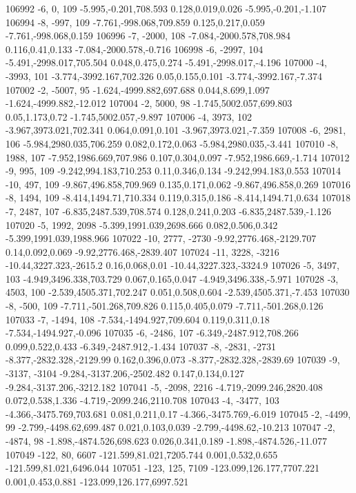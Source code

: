 106992	-6, 0, 109	-5.995,-0.201,708.593	0.128,0.019,0.026	-5.995,-0.201,-1.107
106994	-8, -997, 109	-7.761,-998.068,709.859	0.125,0.217,0.059	-7.761,-998.068,0.159
106996	-7, -2000, 108	-7.084,-2000.578,708.984	0.116,0.41,0.133	-7.084,-2000.578,-0.716
106998	-6, -2997, 104	-5.491,-2998.017,705.504	0.048,0.475,0.274	-5.491,-2998.017,-4.196
107000	-4, -3993, 101	-3.774,-3992.167,702.326	0.05,0.155,0.101	-3.774,-3992.167,-7.374
107002	-2, -5007, 95	-1.624,-4999.882,697.688	0.044,8.699,1.097	-1.624,-4999.882,-12.012
107004	-2, 5000, 98	-1.745,5002.057,699.803	0.05,1.173,0.72	-1.745,5002.057,-9.897
107006	-4, 3973, 102	-3.967,3973.021,702.341	0.064,0.091,0.101	-3.967,3973.021,-7.359
107008	-6, 2981, 106	-5.984,2980.035,706.259	0.082,0.172,0.063	-5.984,2980.035,-3.441
107010	-8, 1988, 107	-7.952,1986.669,707.986	0.107,0.304,0.097	-7.952,1986.669,-1.714
107012	-9, 995, 109	-9.242,994.183,710.253	0.11,0.346,0.134	-9.242,994.183,0.553
107014	-10, 497, 109	-9.867,496.858,709.969	0.135,0.171,0.062	-9.867,496.858,0.269
107016	-8, 1494, 109	-8.414,1494.71,710.334	0.119,0.315,0.186	-8.414,1494.71,0.634
107018	-7, 2487, 107	-6.835,2487.539,708.574	0.128,0.241,0.203	-6.835,2487.539,-1.126
107020	-5, 1992, 2098	-5.399,1991.039,2698.666	0.082,0.506,0.342	-5.399,1991.039,1988.966
107022	-10, 2777, -2730	-9.92,2776.468,-2129.707	0.14,0.092,0.069	-9.92,2776.468,-2839.407
107024	-11, 3228, -3216	-10.44,3227.323,-2615.2	0.16,0.068,0.01	-10.44,3227.323,-3324.9
107026	-5, 3497, 103	-4.949,3496.338,703.729	0.067,0.165,0.047	-4.949,3496.338,-5.971
107028	-3, 4503, 100	-2.539,4505.371,702.247	0.051,0.508,0.604	-2.539,4505.371,-7.453
107030	-8, -500, 109	-7.711,-501.268,709.826	0.115,0.405,0.079	-7.711,-501.268,0.126
107033	-7, -1494, 108	-7.534,-1494.927,709.604	0.119,0.311,0.18	-7.534,-1494.927,-0.096
107035	-6, -2486, 107	-6.349,-2487.912,708.266	0.099,0.522,0.433	-6.349,-2487.912,-1.434
107037	-8, -2831, -2731	-8.377,-2832.328,-2129.99	0.162,0.396,0.073	-8.377,-2832.328,-2839.69
107039	-9, -3137, -3104	-9.284,-3137.206,-2502.482	0.147,0.134,0.127	-9.284,-3137.206,-3212.182
107041	-5, -2098, 2216	-4.719,-2099.246,2820.408	0.072,0.538,1.336	-4.719,-2099.246,2110.708
107043	-4, -3477, 103	-4.366,-3475.769,703.681	0.081,0.211,0.17	-4.366,-3475.769,-6.019
107045	-2, -4499, 99	-2.799,-4498.62,699.487	0.021,0.103,0.039	-2.799,-4498.62,-10.213
107047	-2, -4874, 98	-1.898,-4874.526,698.623	0.026,0.341,0.189	-1.898,-4874.526,-11.077
107049	-122, 80, 6607	-121.599,81.021,7205.744	0.001,0.532,0.655	-121.599,81.021,6496.044
107051	-123, 125, 7109	-123.099,126.177,7707.221	0.001,0.453,0.881	-123.099,126.177,6997.521
